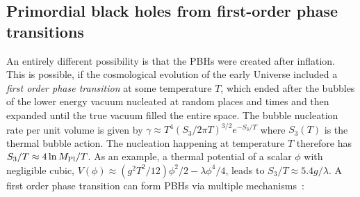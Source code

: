 \subsection{Primordial black holes from first-order phase transitions}
\label{sec:BHth2}
An entirely different possibility is that the PBHs were created after inflation.  
This is possible, if the cosmological evolution of the early Universe included a {\em first order phase transition} at some temperature $T$,
which ended after the bubbles of the lower energy vacuum nucleated at random places and times and then expanded until the true vacuum filled the entire space.
The bubble nucleation rate per unit volume
is given by $\gamma \approx T^4 (S_3/2\pi T)^{3/2} e^{-S_3/T}$ where $S_3(T)$ is the thermal bubble action.
The nucleation happening at temperature $T$ therefore has $S_3/T\approx 4 \ln M_{\rm Pl}/T$.
As an example, a thermal potential of a scalar $\phi$ with negligible cubic, $V(\phi) \approx (g^2 T^2/12)\phi^2/2 - \lambda \phi^4/4$,
leads to $S_3/T \approx  5.4 g/\lambda$.
A first order phase transition can form PBHs via multiple mechanisms~\cite{PBHformationPhaseTransition}:
